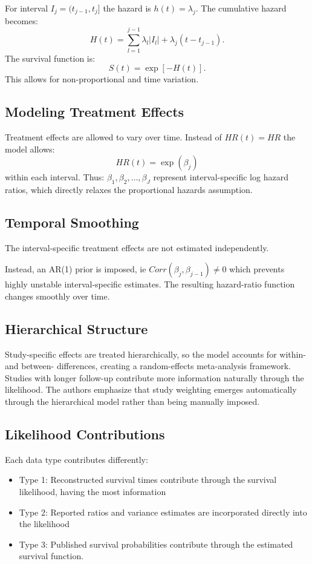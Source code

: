 \documentclass[11pt]{article}
\begin{document}
For interval $I_j=(t_{j-1},t_j ]$ the hazard is $h(t)=\lambda_j$. The cumulative hazard becomes:\[H(t)=\sum_{l=1}^{j-1}\lambda_l |I_l|+\lambda_j(t-t_{j-1}).\]
The survival function is:\[S(t)=\exp[-H(t)].\]This allows for non-proportional and time variation.

\subsection*{Modeling Treatment Effects}

Treatment effects are allowed to vary over time. Instead of $HR(t)=HR$ the model allows:\[HR(t)=\exp(\beta_j)\] within each interval. Thus: $\beta_1,\beta_2,\ldots,\beta_J$ represent interval-specific log hazard ratios, which directly relaxes the proportional hazards assumption.

\subsection*{Temporal Smoothing}

The interval-specific treatment effects are not estimated independently.

Instead, an AR(1) prior is imposed, ie $Corr(\beta_j, \beta_{j-1})\ne 0$ which prevents highly unstable interval-specific estimates. The resulting hazard-ratio function changes smoothly over time.

\subsection*{Hierarchical Structure}

Study-specific effects are treated hierarchically, so the model accounts for within- and between- differences, creating a random-effects meta-analysis framework. Studies with longer follow-up contribute more information naturally through the likelihood. The authors emphasize that study weighting emerges automatically through the hierarchical model rather than being manually imposed.

\subsection*{Likelihood Contributions}

Each data type contributes differently:
\begin{itemize}
    \item Type 1: Reconstructed survival times contribute through the survival likelihood, having the most information
    \item Type 2: Reported ratios and variance estimates are incorporated directly into the likelihood
    \item Type 3: Published survival probabilities contribute through the estimated survival function.
\end{itemize}
\end{document}
